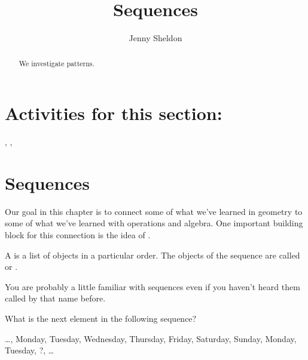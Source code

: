 \documentclass{ximera}
\title{Sequences}
\author{Jenny Sheldon}
\begin{document}
\begin{abstract}
We investigate patterns.
\end{abstract}
\maketitle

\section{Activities for this section:} 
, 
, 

\section{Sequences}

Our goal in this chapter is to connect some of what we've learned in geometry to some of what we've learned with operations and algebra. One important building block for this connection is the idea of .

\begin{definition}
A  is a list of objects in a particular order. The objects of the sequence are called  or .
\end{definition}

You are probably a little familiar with sequences even if you haven't heard them called by that name before.

\begin{question}
What is the next element in the following sequence?

\begin{center}
\dots, Monday, Tuesday, Wednesday, Thursday, Friday, Saturday, Sunday, Monday, Tuesday, ?, \dots
\end{center}

\begin{multipleChoice}
\end{multipleChoice}
\end{question}
\end{document}
